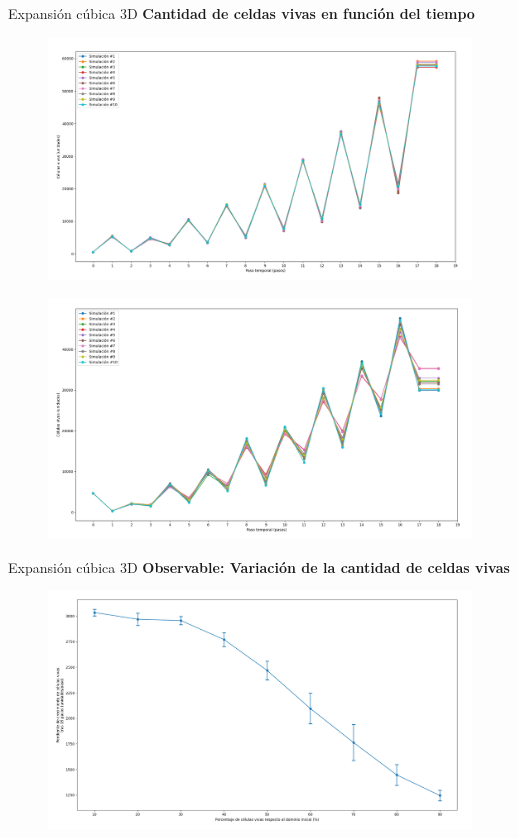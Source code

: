 \begin{frame}{Expansión cúbica 3D}
    \textbf{Cantidad de celdas vivas en función del tiempo}
    \begin{multicols}{2}
        {
            \begin{figure}[H]
                \centering
                \includegraphics[width=0.8\linewidth]{pic/cubo3d/size_i10}
                \label{fig:expcub:size:i10}
            \end{figure}
        }

        {
            \begin{figure}[H]
                \centering
                \includegraphics[width=0.8\linewidth]{pic/cubo3d/size_i80}
                \label{fig:expcub:size:i80}
            \end{figure}
        }
    \end{multicols}
\end{frame}


\begin{frame}{Expansión cúbica 3D}
    \textbf{Observable: Variación de la cantidad de celdas vivas}
    \begin{figure}[H]
        \centering
        \includegraphics[width=0.8\linewidth]{pic/cubo3d/observable}
        \label{fig:expcub:size}
    \end{figure}
\end{frame}

